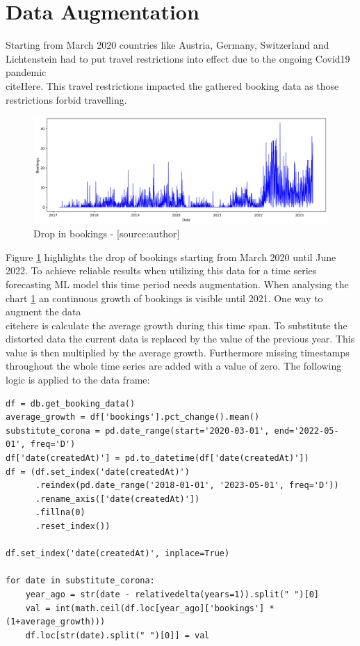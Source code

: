 \section{Data Augmentation}
\label{sec:data_aug}
Starting from March 2020 countries like Austria, Germany, Switzerland and Lichtenstein had to put travel restrictions into effect due to the ongoing Covid19 pandemic \\citeHere. This travel restrictions impacted the gathered booking data as those restrictions forbid travelling.
\begin{figure}[H]
	\centering
		\includegraphics[width=14cm]{images/no_augmentation}
	\caption{Drop in bookings - [source:author]}
	\label{fig:noAug}
\end{figure}
Figure \ref{fig:noAug} highlights the drop of bookings starting from March 2020 until June 2022. To achieve reliable results when utilizing this data for a time series forecasting ML model this time period needs augmentation. When analysing the chart \ref{fig:noAug} an continuous growth of bookings is visible until 2021. One way to augment the data \\citehere is calculate the average growth during this time span. To substitute the distorted data the current data is replaced by the value of the previous year. This value is then multiplied by the average growth. Furthermore missing timestamps throughout the whole time series are added with a value of zero. The following logic is applied to the data frame: 

\begin{lstlisting}
df = db.get_booking_data()
average_growth = df['bookings'].pct_change().mean()
substitute_corona = pd.date_range(start='2020-03-01', end='2022-05-01', freq='D')
df['date(createdAt)'] = pd.to_datetime(df['date(createdAt)'])
df = (df.set_index('date(createdAt)')
      .reindex(pd.date_range('2018-01-01', '2023-05-01', freq='D'))
      .rename_axis(['date(createdAt)'])
      .fillna(0)
      .reset_index())

df.set_index('date(createdAt)', inplace=True)

for date in substitute_corona:
    year_ago = str(date - relativedelta(years=1)).split(" ")[0]
    val = int(math.ceil(df.loc[year_ago]['bookings'] * (1+average_growth)))
    df.loc[str(date).split(" ")[0]] = val
\end{lstlisting}

